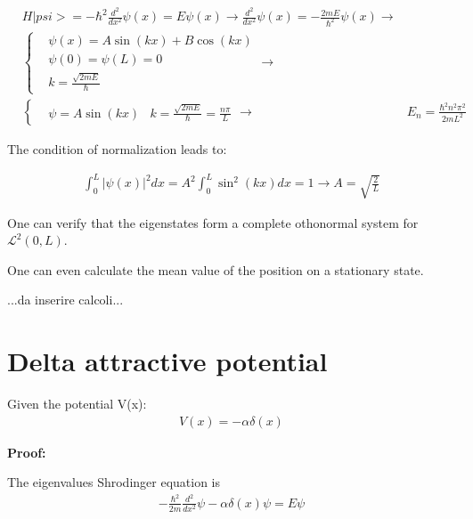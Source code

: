 \documentclass{report}
\begin{document}
\begin{align*}
   & H|psi>=-\hbar^2\frac{d^2}{dx^2} \psi(x)= E\psi(x) \rightarrow \frac{d^2}{dx^2}\psi(x)=-\frac{2mE}{\hbar^2}\psi(x) \rightarrow \\
   & \left\{
  \begin{aligned}
     & \psi(x)=A\sin(kx)+B\cos(kx) \\
     & \psi(0)=\psi(L)=0           \\
     & k= \frac{\sqrt{2mE}}{\hbar}
  \end{aligned}
  \right. \rightarrow                                                                                                              \\
   & \left\{
  \begin{aligned}
     & \psi=A\sin(kx)
     & k= \frac{\sqrt{2mE}}{\hbar}=\frac{n \pi}{L}
  \end{aligned}
  \right. \rightarrow
   & E_n= \frac{\hbar^2 n^2 \pi^2}{2mL^2}
\end{align*}

The condition of normalization leads to:

\begin{align*}
  \int_0^L|\psi(x)|^2 dx=A^2\int_0^L \sin^2(kx)dx=1 \rightarrow A=\sqrt{\frac{2}{L}}
\end{align*}


One can verify that the eigenstates form a complete othonormal system for $\mathcal{L}^2(0,L)$.

One can even calculate the mean value of the position on a stationary state.

...da inserire calcoli...



\section{Delta attractive potential}

\begin{tcolorbox}[colframe=gray!50, colback=gray!10, coltitle=black, title=Delta attractive potential]

  Given the potential V(x):
  \begin{align*}
    V(x)=-\alpha \delta(x)
  \end{align*}


\end{tcolorbox}


\textbf{Proof:}

The eigenvalues Shrodinger equation is
\begin{align*}
  -\frac{\hbar^2}{2m}\frac{d^2}{dx^2}\psi-\alpha \delta(x)\psi=E\psi
\end{align*}
\end{document}
